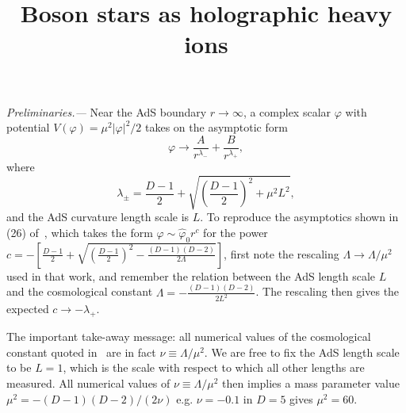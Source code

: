 \documentclass[prl,twocolumn,superscriptaddress]{revtex4-1}
\newcommand{\PRLsection}[1]{\emph{#1.---}}
\begin{document}
\title{Boson stars as holographic heavy ions}

\author{}

\maketitle

\PRLsection{Preliminaries}
Near the AdS boundary $r\rightarrow\infty$, a complex scalar $\varphi$ with potential $V(\varphi)=\mu^2 |\varphi|^2 /2$ takes on the asymptotic form\cite{Henneaux:2006hk,Marolf:2006nd}
\begin{equation}
\varphi \rightarrow \frac{A}{r^{\lambda_-}} + \frac{B}{r^{\lambda_+}},
\end{equation}
where 
\begin{equation}
\lambda_{\pm} = \frac{D-1}{2}+\sqrt{\left( \frac{D-1}{2} \right)^2 + \mu^2 L^2},
\end{equation}
and the AdS curvature length scale is $L$. 
To reproduce the asymptotics shown in (26) of~\cite{Astefanesei:2003qy}, which takes the form $\varphi \sim \hat{\varphi}_0 r^c$ for the power $c=-\left[ \frac{D-1}{2} + \sqrt{\left( \frac{D-1}{2} \right)^2 - \frac{(D-1)(D-2)}{2\Lambda}} \right]$, first note the rescaling $\Lambda \rightarrow \Lambda/\mu^2$ used in that work, and remember the relation between the AdS length scale $L$ and the cosmological constant $\Lambda=-\frac{(D-1)(D-2)}{2 L^2}$.
The rescaling then gives the expected $c\rightarrow -\lambda_+$.

The important take-away message: all numerical values of the cosmological constant quoted in~\cite{Astefanesei:2003qy} are in fact $\nu\equiv\Lambda/\mu^2$. 
We are free to fix the AdS length scale to be $L=1$, which is the scale with respect to which all other lengths are measured. 
All numerical values of $\nu\equiv\Lambda/\mu^2$ then implies a mass parameter value $\mu^2=-(D-1)(D-2)/(2\nu)$ e.g. $\nu=-0.1$ in $D=5$ gives $\mu^2=60$.



\end{document}
